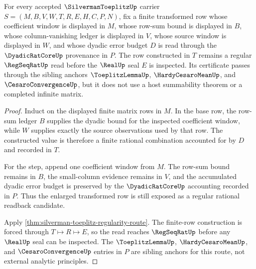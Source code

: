 \begin{theorem}\label{thm:silverman-toeplitz-finite-row-regularity}
For every accepted $\SilvermanToeplitzUp$ carrier $S=(M,B,V,W,T,R,E,H,C,P,N)$, fix a finite transformed row whose coefficient window is displayed in $M$, whose row-sum bound is displayed in $B$, whose column-vanishing ledger is displayed in $V$, whose source window is displayed in $W$, and whose dyadic error budget $D$ is read through the $\DyadicRatCoreUp$ provenance in $P$. The row constructed in $T$ remains a regular $\RegSeqRatUp$ read before the $\RealUp$ seal $E$ is inspected. Its certificate passes through the sibling anchors $\ToeplitzLemmaUp$, $\HardyCesaroMeanUp$, and $\CesaroConvergenceUp$, but it does not use a host summability theorem or a completed infinite matrix.
\end{theorem}
\begin{proof}
Induct on the displayed finite matrix rows in $M$. In the base row, the row-sum ledger $B$ supplies the dyadic bound for the inspected coefficient window, while $W$ supplies exactly the source observations used by that row. The constructed value is therefore a finite rational combination accounted for by $D$ and recorded in $T$.

For the step, append one coefficient window from $M$. The row-sum bound remains in $B$, the small-column evidence remains in $V$, and the accumulated dyadic error budget is preserved by the $\DyadicRatCoreUp$ accounting recorded in $P$. Thus the enlarged transformed row is still exposed as a regular rational readback candidate.

Apply \autoref{thm:silverman-toeplitz-regularity-route}. The finite-row construction is forced through $T \longmapsto R \longmapsto E$, so the read reaches $\RegSeqRatUp$ before any $\RealUp$ seal can be inspected. The $\ToeplitzLemmaUp$, $\HardyCesaroMeanUp$, and $\CesaroConvergenceUp$ entries in $P$ are sibling anchors for this route, not external analytic principles.
\end{proof}

